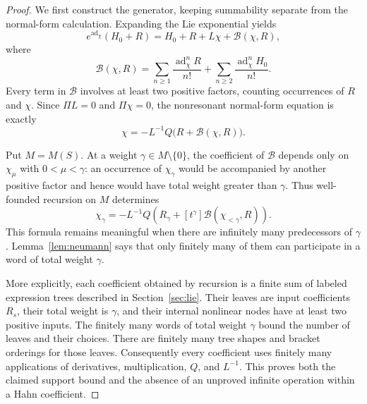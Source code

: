 \documentclass[11pt,letterpaper]{article}
\numberwithin{equation}{section}
\theoremstyle{definition}
\theoremstyle{remark}
\newcommand{\ad}{\operatorname{ad}}
\begin{document}
\begin{proof}
We first construct the generator, keeping summability separate from the
normal-form calculation. Expanding the Lie exponential yields
\begin{equation}\label{eq:normalexpansion}
 e^{\ad_\chi}(H_0+R)=H_0+R+L\chi+\mathcal B(\chi,R),
\end{equation}
where
\begin{equation}\label{eq:Bdef}
 \mathcal B(\chi,R)=
 \sum_{n\ge1}\frac{\ad_\chi^n R}{n!}
 +\sum_{n\ge2}\frac{\ad_\chi^n H_0}{n!}.
\end{equation}
Every term in $\mathcal B$ involves at least two positive factors, counting
occurrences of $R$ and $\chi$. Since $\Pi L=0$ and $\Pi\chi=0$, the
nonresonant normal-form equation is exactly
\begin{equation}\label{eq:chifixed}
 \chi=-L^{-1}Q\bigl(R+\mathcal B(\chi,R)\bigr).
\end{equation}

Put $M=M(S)$. At a weight $\gamma\in M\setminus\{0\}$, the coefficient of
$\mathcal B$ depends only on $\chi_\mu$ with $0<\mu<\gamma$: an occurrence
of $\chi_\gamma$ would be accompanied by another positive factor and hence
would have total weight greater than $\gamma$. Thus well-founded recursion
on $M$ determines
\begin{equation}\label{eq:coefficientrecursion}
 \chi_\gamma=-L^{-1}Q\left(R_\gamma+
      [t^\gamma]\mathcal B(\chi_{<\gamma},R)\right).
\end{equation}
This formula remains meaningful when there are infinitely many predecessors
of $\gamma$. Lemma~\ref{lem:neumann} says that only finitely many of them
can participate in a word of total weight $\gamma$.

More explicitly, each coefficient obtained by recursion is a finite sum of
labeled expression trees described in Section~\ref{sec:lie}. Their leaves
are input coefficients $R_s$, their total weight is $\gamma$, and their
internal nonlinear nodes have at least two positive inputs. The finitely
many words of total weight $\gamma$ bound the number of leaves and their
choices. There are finitely many tree shapes and bracket orderings for
those leaves. Consequently every coefficient uses finitely many
applications of derivatives, multiplication, $Q$, and $L^{-1}$. This proves
both the claimed support bound and the absence of an unproved infinite
operation within a Hahn coefficient.


\end{proof}
\end{document}
